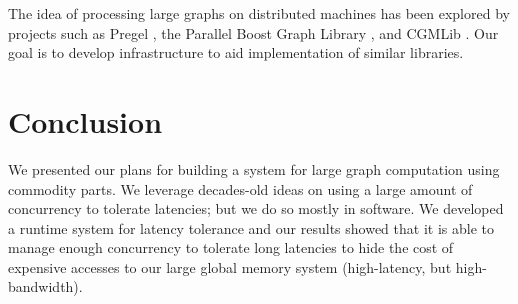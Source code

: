 \documentclass[10pt,nocopyrightspace,preprint]{sigplanconf}
\begin{document}
The idea of processing large graphs on distributed machines has been
explored by projects such as Pregel \cite{pregel}, the Parallel Boost
Graph Library \cite{parallelbgl}, and CGMLib \cite{cgmlib}. Our goal
is to develop infrastructure to aid implementation of similar
libraries.

\section{Conclusion}
\label{sec:conclusion}

We presented our plans for building a system for large graph
computation using commodity parts. We leverage decades-old ideas on
using a large amount of concurrency to tolerate latencies; but we do so
mostly in software. We developed a runtime system for latency
tolerance and our results showed that it is able to manage enough
concurrency to tolerate long latencies to hide the cost of
expensive accesses to our large global memory system (high-latency,
but high-bandwidth).



\end{document}
